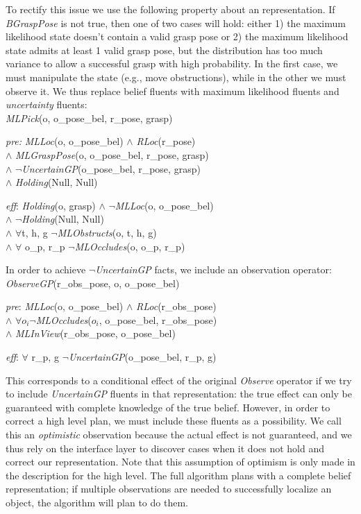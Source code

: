 To rectify this issue we use the following property about an \mld{}
representation. If \emph{BGraspPose} is not true, then one of two
cases will hold: either 1) the maximum likelihood state doesn't contain a valid grasp pose or 2) the maximum likelihood state admits at least 1 valid grasp pose, but the distribution has too much variance to allow
a successful grasp with high probability. In the first case, we must
manipulate the state (e.g., move obstructions), while in the other we must observe it. We
thus replace belief fluents with maximum likelihood fluents and
\emph{uncertainty} fluents:\\
\emph{MLPick}(o, o\_pose\_bel, r\_pose, grasp)
\vspace{-2pt}
\begin{tightlist}
\item[\emph{pre:}] \emph{MLLoc}(o, o\_pose\_bel) $\wedge$
  \emph{RLoc}(r\_pose) \\$\wedge$ \emph{MLGraspPose}(o,
  o\_pose\_bel, r\_pose, grasp) \\$\wedge$
  $\lnot$\emph{UncertainGP}(o\_pose\_bel, r\_pose, grasp)\\$\wedge$
  \emph{Holding}(Null, Null)
\item[\emph{eff}:] \emph{Holding}(o, grasp) $\wedge$
  $\lnot$\emph{MLLoc}(o, o\_pose\_bel) \\$\wedge$
  $\lnot$\emph{Holding}(Null, Null) \\$\wedge$ $\forall$t, h, g
  $\lnot$\emph{MLObstructs}(o, t, h, g)\\ $\wedge$ $\forall$ o\_p,
  r\_p $\lnot$\emph{MLOccludes}(o, o\_p, r\_p)
\end{tightlist}
In order to achieve $\lnot$\emph{UncertainGP} facts, we include an
observation operator:\\
\emph{ObserveGP}(r\_obs\_pose, o, o\_pose\_bel)
\begin{tightlist}
  \item[\emph{pre}:] \emph{MLLoc}(o, o\_pose\_bel) $\wedge$
    \emph{RLoc}(r\_obs\_pose) \\$\wedge$ $\forall o_i
    \lnot$\emph{MLOccludes}($o_i$, o\_pose\_bel, r\_obs\_pose) \\ $\wedge$
    \emph{MLInView}(r\_obs\_pose, o\_pose\_bel)
  \item[\emph{eff}:] $\forall$ r\_p, g $\lnot$\emph{UncertainGP}(o\_pose\_bel, r\_p, g)
\end{tightlist}
This corresponds to a conditional effect of the original
\emph{Observe} operator if we try to include \emph{UncertainGP}
fluents in that representation: the true effect can only be guaranteed
with complete knowledge of the true belief. However,
in order to correct a high level plan, we must include these fluents as a
possibility. We call this an \emph{optimistic} observation because the actual
effect is not guaranteed, and we thus rely on the interface layer to discover
cases when it does not hold and correct our representation. Note that
this assumption of optimism is only made in the description for the high
level. The full algorithm plans with a complete belief representation; if
multiple observations are needed to successfully localize an object, the algorithm
will plan to do them.

